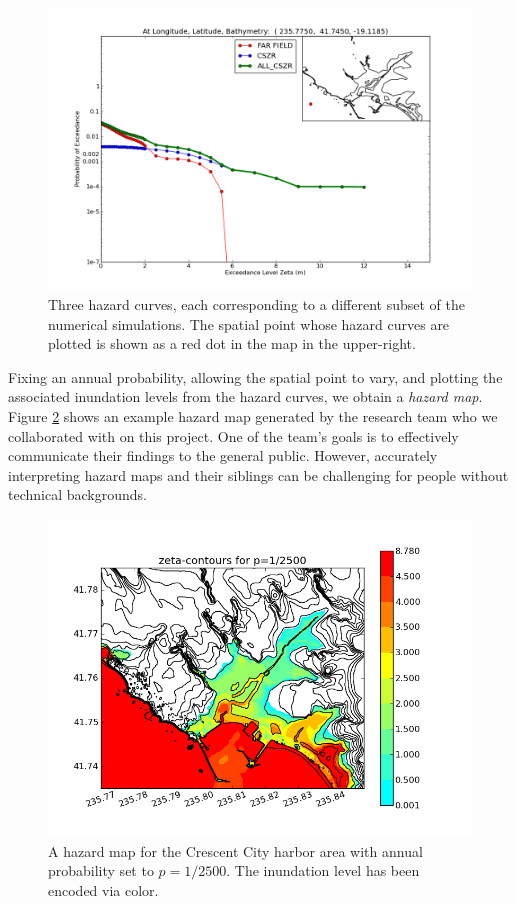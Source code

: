 \documentclass{vgtc}                          %
\begin{document}
\begin{figure}[b!]
    \centering
    \includegraphics[width=\columnwidth]{pictures/HazardCurveFarCascacadiaAll_GridPoint_093474.png}
    \caption{Three hazard curves, each corresponding to a different subset of the numerical simulations. The spatial point whose hazard curves are plotted is shown as a red dot in the map in the upper-right.}
    \label{fig:hazard-curve}
\end{figure}

Fixing an annual probability, allowing the spatial point to vary, and plotting the associated inundation levels from the hazard curves, we obtain a \emph{hazard map}. Figure \ref{fig:hazard-map} shows an example hazard map generated by the research team who we collaborated with on this project. One of the team's goals is to effectively communicate their findings to the general public. However, accurately interpreting hazard maps and their siblings can be challenging for people without technical backgrounds.

\begin{figure}[t!]
    \centering
    \includegraphics[width=\columnwidth]{pictures/zeta-contours_prob_0004.png}
    \caption{A hazard map for the Crescent City harbor area with annual probability set to $p=1/2500$. The inundation level has been encoded via color.}
    \label{fig:hazard-map}
\end{figure}
\end{document}
